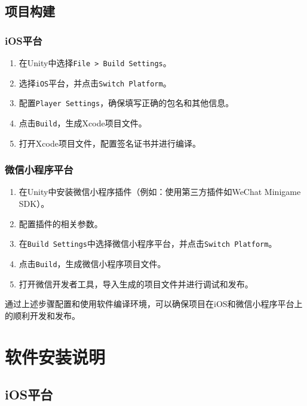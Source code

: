 \documentclass{mancls}%
\begin{document}
\subsection{项目构建}

\subsubsection{iOS平台}

\begin{enumerate}
  \item 在Unity中选择\texttt{File > Build Settings}。
  \item 选择\texttt{iOS}平台，并点击\texttt{Switch Platform}。
  \item 配置\texttt{Player Settings}，确保填写正确的包名和其他信息。
  \item 点击\texttt{Build}，生成Xcode项目文件。
  \item 打开Xcode项目文件，配置签名证书并进行编译。
\end{enumerate}

\subsubsection{微信小程序平台}

\begin{enumerate}
  \item 在Unity中安装微信小程序插件（例如：使用第三方插件如WeChat Minigame SDK）。
  \item 配置插件的相关参数。
  \item 在\texttt{Build Settings}中选择微信小程序平台，并点击\texttt{Switch Platform}。
  \item 点击\texttt{Build}，生成微信小程序项目文件。
  \item 打开微信开发者工具，导入生成的项目文件并进行调试和发布。
\end{enumerate}

通过上述步骤配置和使用软件编译环境，可以确保项目在iOS和微信小程序平台上的顺利开发和发布。
\pagebreak

\section{软件安装说明}

\subsection{iOS平台}
\end{document}
